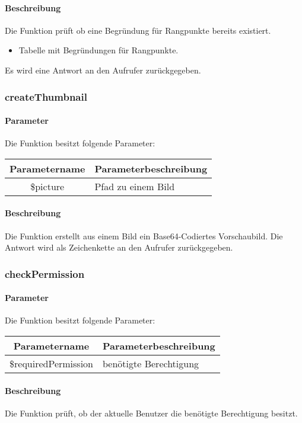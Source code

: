 \paragraph{Beschreibung} Die Funktion prüft ob eine Begründung für Rangpunkte bereits existiert.
\begin{itemize}
	\item Tabelle mit Begründungen für Rangpunkte.
\end{itemize}
Es wird eine Antwort an den Aufrufer zurückgegeben.
\subsubsection{createThumbnail}
\paragraph{Parameter} Die Funktion besitzt folgende Parameter:
\begin{table}[H]
	\begin{tabular}{|c|p{11cm}|}
		\hline
		\textbf{Parametername} & \textbf{Parameterbeschreibung} \\ \hline
		\$picture & Pfad zu einem Bild \\ \hline
	\end{tabular}
\end{table}
\paragraph{Beschreibung} Die Funktion erstellt aus einem Bild ein Base64-Codiertes Vorschaubild. Die Antwort wird als Zeichenkette an den Aufrufer zurückgegeben.
\subsubsection{checkPermission}
\paragraph{Parameter} Die Funktion besitzt folgende Parameter:
\begin{table}[H]
	\begin{tabular}{|c|p{11cm}|}
		\hline
		\textbf{Parametername} & \textbf{Parameterbeschreibung} \\ \hline
		\$requiredPermission & benötigte Berechtigung \\ \hline
	\end{tabular}
\end{table}
\paragraph{Beschreibung} Die Funktion prüft, ob der aktuelle Benutzer die benötigte Berechtigung besitzt.
